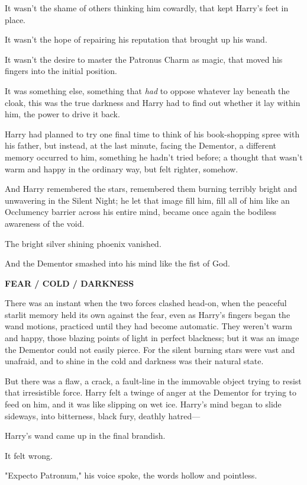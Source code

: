 It wasn't the shame of others thinking him cowardly, that kept Harry's feet in 
place.

It wasn't the hope of repairing his reputation that brought up his wand.

It wasn't the desire to master the Patronus Charm as magic, that moved his 
fingers into the initial position.

It was something else, something that \emph{had} to oppose whatever lay beneath 
the cloak, this was the true darkness and Harry had to find out whether it lay 
within him, the power to drive it back.

Harry had planned to try one final time to think of his book-shopping spree 
with his father, but instead, at the last minute, facing the Dementor, a 
different memory occurred to him, something he hadn't tried before; a thought 
that wasn't warm and happy in the ordinary way, but felt righter, somehow.

And Harry remembered the stars, remembered them burning terribly bright and 
unwavering in the Silent Night; he let that image fill him, fill all of him 
like an Occlumency barrier across his entire mind, became once again the 
bodiless awareness of the void.

The bright silver shining phoenix vanished.

And the Dementor smashed into his mind like the fist of God.

\textbf{FEAR / COLD / DARKNESS}

There was an instant when the two forces clashed head-on, when the peaceful 
starlit memory held its own against the fear, even as Harry's fingers began the 
wand motions, practiced until they had become automatic. They weren't warm and 
happy, those blazing points of light in perfect blackness; but it was an image 
the Dementor could not easily pierce. For the silent burning stars were vast 
and unafraid, and to shine in the cold and darkness was their natural state.

But there was a flaw, a crack, a fault-line in the immovable object trying to 
resist that irresistible force. Harry felt a twinge of anger at the Dementor 
for trying to feed on him, and it was like slipping on wet ice. Harry's mind 
began to slide sideways, into bitterness, black fury, deathly hatred---

Harry's wand came up in the final brandish.

It felt wrong.

"Expecto Patronum," his voice spoke, the words hollow and pointless.

